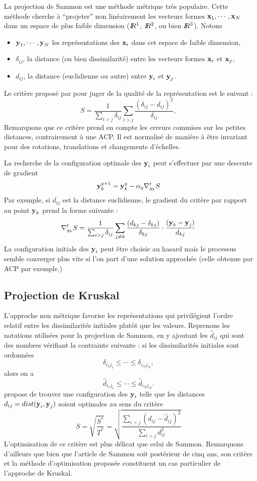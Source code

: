 La projection de Sammon est une m\'ethode m\'etrique tr\`es
populaire. Cette m\'ethode cherche \`a ``projeter'' non
lin\'eairement les vecteurs formes $\mbox{\bf x}_1, \cdots, \mbox{\bf x}_N$ dans un espace de
plus faible dimension ($I\!\!R^1$, $I\!\!R^2$, ou bien $I\!\!R^3$). Notons
\begin{itemize}
\item
$\mbox{\bf y}_1, \cdots, \mbox{\bf y}_N$ les repr\'esentations des $\mbox{\bf x}_i$ dans cet
espace de faible dimension,
\item
$\delta_{ij}$, la distance (ou bien dissimilarit\'e) entre les vecteurs
formes $\mbox{\bf x}_i$ et $\mbox{\bf x}_j$,
\item
$d_{ij}$, la distance (euclidienne ou autre) entre  $\mbox{\bf y}_i$ et $\mbox{\bf y}_j$.  
\end{itemize}
Le crit\`ere propos\'e par  pour juger de la 
qualit\'e de la repr\'esentation est le suivant : 
\begin{equation}
S=\frac{1}{\sum_{i>j} \delta_{ij}} \sum_{i>j}\frac{(\delta_{ij}-d_{ij})^2}{\delta_{ij}},
\end{equation}
Remarquons que ce crit\`ere prend en compte les erreurs commises sur les
petites distances, contrairement \`a une ACP. Il est normalis\'e de mani\`ere
\`a \^etre invariant pour des rotations, translations et changements d'\'echelles.

La recherche de la configuration optimale des $\mbox{\bf y}_i$ peut s'effectuer
par une descente de gradient
$$
\mbox{\bf y}_k^{q+1}= \mbox{\bf y}_k^q -\alpha_q  \nabla_{y_k}^t S
$$
Par exemple, si $d_{ij}$ est la distance euclidienne,
le gradient du crit\`ere par rapport au point $\mbox{\bf y}_k$ prend la forme 
suivante :
$$
\nabla_{y_k}^t S = \frac{1}{\sum_{i>j} \delta_{ij}} \sum_{j \neq k} \frac{(d_{kj}-\delta_{kj})}{\delta_{kj}} \cdot \frac{(\mbox{\bf y}_{k}-\mbox{\bf y}_{j})}{d_{kj}} 
$$
La configuration initiale des $\mbox{\bf y}_i$ peut \^etre choisie au hasard mais le
processus semble converger plus vite si l'on part d'une solution 
approch\'ee (celle obtenue par ACP par exemple.)


\subsection{Projection de Kruskal}

L'approche non m\'etrique favorise les repr\'esentations qui 
privil\'egient l'ordre relatif entre les dissimilarit\'es initiales 
plut\^ot que les valeurs.  Reprenons les notations utilis\'ees pour
la projection de Sammon, en y ajoutant les $\hat{d}_{ij}$ qui sont
des nombres v\'erifiant la contrainte suivante : 
si les dissimilarit\'es initiales sont ordonn\'ees
$$
\delta_{i_1 j_1} \leq \cdots \leq \delta_{i_N j_N},
$$
alors on a
$$
\hat{d}_{i_1 j_1} \leq \cdots \leq \hat{d}_{i_N j_N}.
$$
 propose de trouver une configuration des
$\mbox{\bf y}_i$ telle que les distances $d_{ij}=dist(\mbox{\bf y}_i,\mbox{\bf y}_j)$ soient
optimales au sens du crit\`ere
$$
S=\sqrt{\frac{S^*}{T^*}}=\sqrt{\frac{\sum_{i>j}(d_{ij}-\hat{d}_{ij})^2}{\sum_{i>j} d_{ij}^2}}
$$ 
L'optimisation de ce crit\`ere est plus d\'elicat que  celui de
Sammon. Remarquons d'ailleurs que bien que l'article de
Sammon soit post\'erieur de cinq ans, son crit\`ere et
la m\'ethode d'optimisation propos\'ee constituent un 
cas particulier de l'approche de Kruskal.


